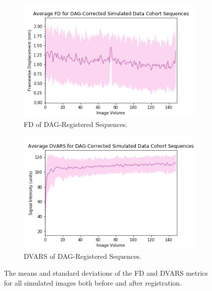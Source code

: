 \begin{figure}[t]
	\begin{subfigure}{0.4\textwidth}
		\centering
		\includegraphics[width=1.0\textwidth]{6/figures/spectr-dag-fd-150.png}
		\caption{FD of DAG-Registered Sequences.}
	\end{subfigure}
	\hspace{0.05\textwidth}
	\begin{subfigure}{0.4\textwidth}
		\centering
		\includegraphics[width=1.0\textwidth]{6/figures/spectr-dag-dvars-150.png}
		\caption{DVARS of DAG-Registered Sequences.}
	\end{subfigure}
\caption{The means and standard deviations of the FD and DVARS metrics for all simulated images both before and after registration.}
\label{fig:spectr-power-dists}
\end{figure}

